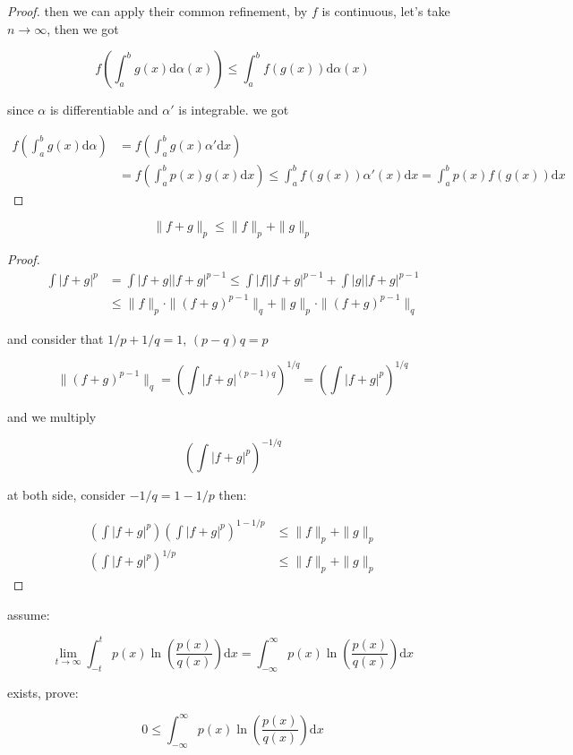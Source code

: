 \documentclass[11pt,a4paper]{article}
\begin{document}
\begin{proof}
    then we can apply their common refinement, by $f$ is continuous, let's take $n \to \infty$, then we got

    \[
        f\left(\int_a^b g(x) \mathrm{d} \alpha(x)\right) \le \int_a^b f(g(x)) \mathrm{d} \alpha(x)
    \]

    since $\alpha$ is differentiable and $\alpha'$ is integrable. we got


    \begin{align*}
        f\left(\int_a^b g(x) \mathrm{d} \alpha\right) &= f\left(\int_a^b g(x) \alpha' \mathrm{d}x \right) \\
        &= f\left(\int_a^b p(x) g(x) \mathrm{d}x \right) \le \int_a^b f(g(x)) \alpha'(x) \mathrm{d}x = \int_a^b p(x) f(g(x)) \mathrm{d}x
    \end{align*}
    

\end{proof}

\begin{thm}
    \[
        \| f + g\|_p \le \| f \|_p+ \|g\|_p
    \]
\end{thm}

\begin{proof}
    \begin{align*}
        \int |f+g|^p &= \int |f+g||f+g|^{p-1} \le \int |f||f+g|^{p-1} + \int |g||f+g|^{p-1} \\
        & \le \| f  \|_p \cdot \| (f + g)^{p-1} \|_q + \| g  \|_p \cdot \| (f + g)^{p-1} \|_q
    \end{align*}

    and consider that $1/p + 1/q = 1$, $(p-q)q = p$

    \[
        \| (f + g)^{p-1} \|_q = \left( \int |f+g|^{(p-1)q} \right)^{1/q} = \left( \int |f+g|^{p} \right)^{1/q}
    \]

    and we multiply 

    \[
        \left( \int |f+g|^{p} \right)^{-1/q}
    \]

    at both side, consider $-1/q = 1-1/p$ then:


    \begin{align*}
        \left(\int |f+g|^p\right) \left(\int |f+g|^p\right)^{1-1/p} & \le \| f  \|_p + \| g  \|_p  \\
         \left(\int |f+g|^p\right)^{1/p} & \le \| f  \|_p + \| g  \|_p 
    \end{align*}
\end{proof}

\begin{exercise}
    assume:


    \[
        \lim_{t \to \infty}\int_{-t}^{t} p(x) \ln \left(\frac{p(x)}{q(x)} \right) \mathrm{d}x = \int_{-\infty}^{\infty} p(x) \ln \left(\frac{p(x)}{q(x)} \right)  \mathrm{d}x
    \]

    exists, prove:

    \[
        0 \le \int_{-\infty}^{\infty} p(x) \ln \left(\frac{p(x)}{q(x)} \right)  \mathrm{d}x
    \]
\end{exercise}
\end{document}
